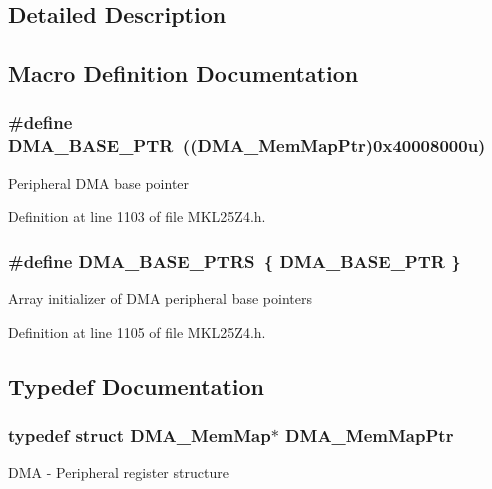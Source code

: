 \subsection{Detailed Description}


\subsection{Macro Definition Documentation}
\subsubsection[{\texorpdfstring{D\+M\+A\+\_\+\+B\+A\+S\+E\+\_\+\+P\+TR}{DMA_BASE_PTR}}]{\setlength{\rightskip}{0pt plus 5cm}\#define D\+M\+A\+\_\+\+B\+A\+S\+E\+\_\+\+P\+TR~(({\bf D\+M\+A\+\_\+\+Mem\+Map\+Ptr})0x40008000u)}\hypertarget{group___d_m_a___peripheral_ga6997fbc1b1973e9f27170217a3bd6f22}{}\label{group___d_m_a___peripheral_ga6997fbc1b1973e9f27170217a3bd6f22}
Peripheral D\+MA base pointer 

Definition at line 1103 of file M\+K\+L25\+Z4.\+h.

\subsubsection[{\texorpdfstring{D\+M\+A\+\_\+\+B\+A\+S\+E\+\_\+\+P\+T\+RS}{DMA_BASE_PTRS}}]{\setlength{\rightskip}{0pt plus 5cm}\#define D\+M\+A\+\_\+\+B\+A\+S\+E\+\_\+\+P\+T\+RS~\{ {\bf D\+M\+A\+\_\+\+B\+A\+S\+E\+\_\+\+P\+TR} \}}\hypertarget{group___d_m_a___peripheral_gada914e90165e25ae4eeddf5175920e77}{}\label{group___d_m_a___peripheral_gada914e90165e25ae4eeddf5175920e77}
Array initializer of D\+MA peripheral base pointers 

Definition at line 1105 of file M\+K\+L25\+Z4.\+h.



\subsection{Typedef Documentation}
\subsubsection[{\texorpdfstring{D\+M\+A\+\_\+\+Mem\+Map\+Ptr}{DMA_MemMapPtr}}]{\setlength{\rightskip}{0pt plus 5cm}typedef struct {\bf D\+M\+A\+\_\+\+Mem\+Map}$\ast$ {\bf D\+M\+A\+\_\+\+Mem\+Map\+Ptr}}\hypertarget{group___d_m_a___peripheral_ga160c27c95a39a9791079b32fe7e843a1}{}\label{group___d_m_a___peripheral_ga160c27c95a39a9791079b32fe7e843a1}
D\+MA -\/ Peripheral register structure 